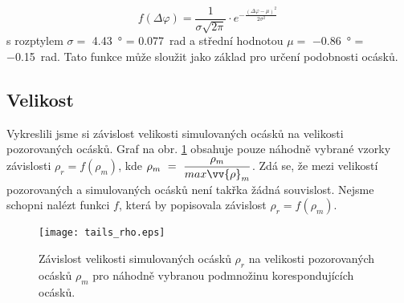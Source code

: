 \begin{equation}
f(\Delta\varphi) = \frac{1}{\sigma\sqrt{2\pi}}\cdot e^{-\frac{\left(\Delta\varphi - \mu\right)^2}{2\sigma^2}}\, 
\end{equation}
s rozptylem $\sigma =  $ \SI{4.43}{\degree} = \SI{0.077}{\radian} a střední hodnotou $\mu = $ \SI{-0.86}{\degree} = \SI{-0.15}{\radian}. Tato funkce může sloužit jako základ pro určení podobnosti ocásků.   

\subsection{Velikost}
	Vykreslili jsme si závislost velikosti simulovaných ocásků na velikosti pozorovaných ocásků. Graf na obr. \ref{fig: tail_depend2} obsahuje pouze náhodně vybrané vzorky závislosti $\rho_r = f(\rho_m)$, kde $\rho_m~=~\dfrac{\rho_m}{max{\vv{\rho}_m}}$. Zdá se, že mezi velikostí pozorovaných a simulovaných ocásků není takřka žádná souvislost. Nejsme schopni nalézt funkci $f$, která by popisovala závislost $\rho_r = f(\rho_m)$.
	
	\begin{figure}[htps]
\centering
\texttt{[image: tails\_rho.eps]}
\caption[Závislost velikosti simulovaných a pozorovaných ocásků.]{Závislost velikosti simulovaných ocásků $\rho_r$ na velikosti pozorovaných ocásků $\rho_m$ pro náhodně vybranou podmnožinu korespondujících ocásků.}
\label{fig: tail_depend2}
\end{figure}

\clearpage
